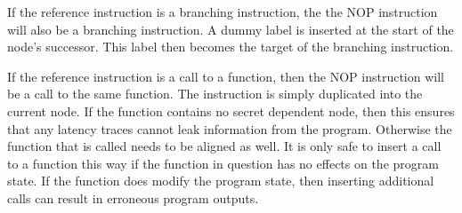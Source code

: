 If the reference instruction is a branching instruction, the the NOP instruction will also be a branching instruction. 
A dummy label is inserted at the start of the node's successor. This label then becomes the target of the branching instruction. 

If the reference instruction is a call to a function, then the NOP instruction will be  a call to the same function. The instruction is simply duplicated into the current node. 
If the function contains no secret dependent node, then this ensures that any latency traces cannot leak information from the program. Otherwise the function that is called needs to be aligned as well. 
It is only safe to insert a call to a function this way if the function in question has no effects on the program state. 
If the function does modify the program state, then inserting additional calls can result in erroneous program outputs. 


